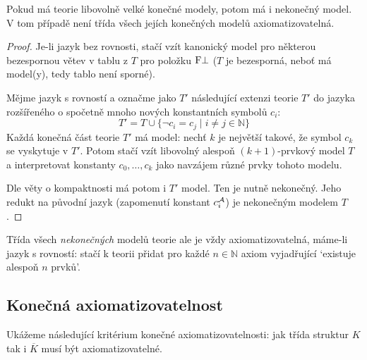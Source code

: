 \begin{theorem}
    Pokud má teorie libovolně velké konečné modely, potom má i nekonečný model. V tom případě není třída všech jejích konečných modelů axiomatizovatelná.
\end{theorem}
\begin{proof}
    Je-li jazyk bez rovnosti, stačí vzít kanonický model pro některou bezespornou větev v tablu z $T$ pro položku $\mathrm{F}\bot$ ($T$ je bezesporná, neboť má model(y), tedy tablo není sporné).     
    
    Mějme jazyk s rovností a označme jako $T'$ následující extenzi teorie $T'$ do jazyka rozšířeného o spočetně mnoho nových konstantních symbolů $c_i$:
    $$
    T'=T \cup \{\neg c_i = c_j \mid i\neq j\in\mathbb N\}
    $$
    Každá konečná část teorie $T'$ má model: nechť $k$ je největší takové, že symbol $c_k$ se vyskytuje v $T'$. Potom stačí vzít libovolný alespoň $(k+1)$-prvkový model $T$ a interpretovat konstanty $c_0,\dots,c_k$ jako navzájem různé prvky tohoto modelu.

    Dle věty o kompaktnosti má potom i $T'$ model. Ten je nutně nekonečný. Jeho redukt na původní jazyk (zapomenutí konstant $c_i^{\mathcal{A}}$) je nekonečným modelem $T$.
\end{proof}

\begin{remark}
    Třída všech \emph{nekonečných} modelů teorie ale je vždy axiomatizovatelná, máme-li jazyk s rovností: stačí k teorii přidat pro každé $n\in\mathbb N$ axiom vyjadřující `existuje alespoň $n$ prvků'.
\end{remark}


\subsection{Konečná axiomatizovatelnost}

Ukážeme následující kritérium konečné axiomatizovatelnosti: jak třída struktur $K$ tak i $\overline{K}$ musí být axiomatizovatelné.

